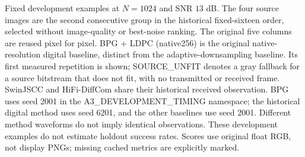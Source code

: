 \caption{Fixed development examples at $N=1024$ and SNR $13$ dB. The four source images are the second consecutive group in the historical fixed-sixteen order, selected without image-quality or best-noise ranking. The original five columns are reused pixel for pixel. BPG + LDPC (native256) is the original native-resolution digital baseline, distinct from the adaptive-downsampling baseline. Its first measured repetition is shown; SOURCE\_UNFIT denotes a gray fallback for a source bitstream that does not fit, with no transmitted or received frame. SwinJSCC and HiFi-DiffCom share their historical received observation. BPG uses seed 2001 in the A3\_DEVELOPMENT\_TIMING namespace; the historical digital method uses seed 6201, and the other baselines use seed 2001. Different method waveforms do not imply identical observations. These development examples do not estimate holdout success rates. Scores use original float RGB, not display PNGs; missing cached metrics are explicitly marked.}
